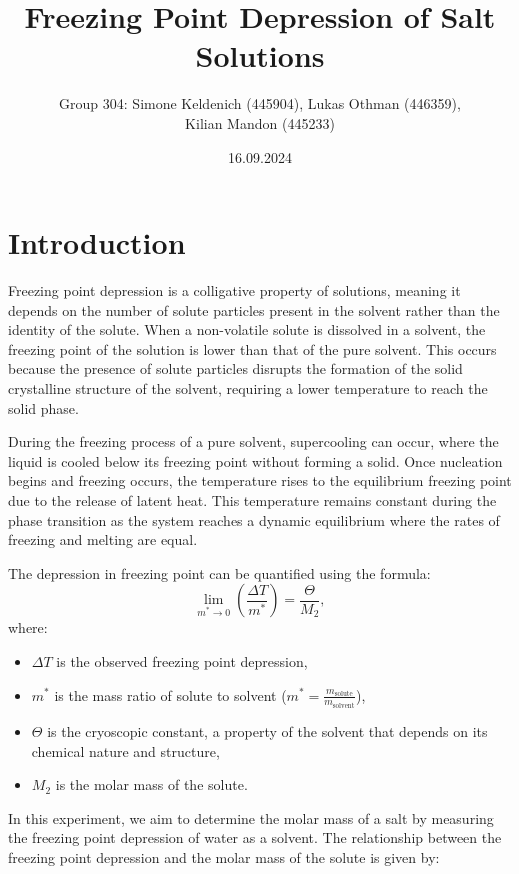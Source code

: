 \documentclass[a4paper,12pt]{article}
\title{Freezing Point Depression of Salt Solutions}
\author{Group 304: Simone Keldenich (445904), Lukas Othman (446359), \\Kilian Mandon (445233)}
\date{16.09.2024}
\begin{document}
\maketitle
\newpage

\section{Introduction}
Freezing point depression is a colligative property of solutions, meaning it depends on the number of solute particles present in the solvent rather than the identity of the solute. When a non-volatile solute is dissolved in a solvent, the freezing point of the solution is lower than that of the pure solvent. This occurs because the presence of solute particles disrupts the formation of the solid crystalline structure of the solvent, requiring a lower temperature to reach the solid phase.

During the freezing process of a pure solvent, supercooling can occur, where the liquid is cooled below its freezing point without forming a solid. Once nucleation begins and freezing occurs, the temperature rises to the equilibrium freezing point due to the release of latent heat. This temperature remains constant during the phase transition as the system reaches a dynamic equilibrium where the rates of freezing and melting are equal.

The depression in freezing point can be quantified using the formula:
\begin{equation}
\lim_{m^* \to 0} \left(\frac{\Delta T}{m^*}\right) = \frac{\Theta}{M_2},
\end{equation}
where:
\begin{itemize}
    \item \(\Delta T\) is the observed freezing point depression,
    \item \(m^*\) is the mass ratio of solute to solvent (\(m^* = \frac{m_{\text{solute}}}{m_{\text{solvent}}}\)),
    \item \(\Theta\) is the cryoscopic constant, a property of the solvent that depends on its chemical nature and structure,
    \item \(M_2\) is the molar mass of the solute.
\end{itemize}

In this experiment, we aim to determine the molar mass of a salt by measuring the freezing point depression of water as a solvent. The relationship between the freezing point depression and the molar mass of the solute is given by:
\end{document}
